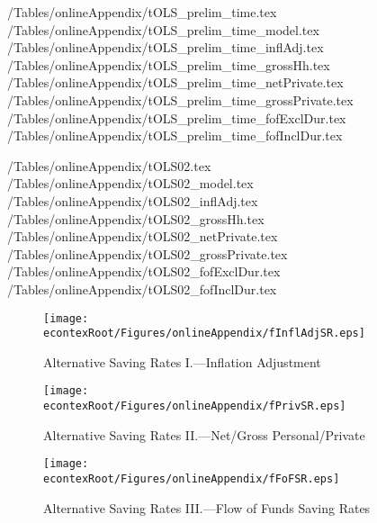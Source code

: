 
\econtexRoot/Tables/onlineAppendix/tOLS_prelim_time.tex
\econtexRoot/Tables/onlineAppendix/tOLS_prelim_time_model.tex
\econtexRoot/Tables/onlineAppendix/tOLS_prelim_time_inflAdj.tex
\econtexRoot/Tables/onlineAppendix/tOLS_prelim_time_grossHh.tex
\econtexRoot/Tables/onlineAppendix/tOLS_prelim_time_netPrivate.tex
\econtexRoot/Tables/onlineAppendix/tOLS_prelim_time_grossPrivate.tex
\econtexRoot/Tables/onlineAppendix/tOLS_prelim_time_fofExclDur.tex
\econtexRoot/Tables/onlineAppendix/tOLS_prelim_time_fofInclDur.tex

\clearpage
\econtexRoot/Tables/onlineAppendix/tOLS02.tex
\econtexRoot/Tables/onlineAppendix/tOLS02_model.tex
\econtexRoot/Tables/onlineAppendix/tOLS02_inflAdj.tex
\econtexRoot/Tables/onlineAppendix/tOLS02_grossHh.tex
\econtexRoot/Tables/onlineAppendix/tOLS02_netPrivate.tex
\econtexRoot/Tables/onlineAppendix/tOLS02_grossPrivate.tex
\econtexRoot/Tables/onlineAppendix/tOLS02_fofExclDur.tex
\econtexRoot/Tables/onlineAppendix/tOLS02_fofInclDur.tex
\clearpage


\begin{figure}
\caption{Alternative Saving Rates I.---Inflation Adjustment}
\begin{center} \label{fInflAdjSR}
\texttt{[image: \\econtexRoot/Figures/onlineAppendix/fInflAdjSR.eps]}
\end{center}
\end{figure}

\begin{figure}
\caption{Alternative Saving Rates II.---Net/Gross Personal/Private}
\begin{center} \label{fPrivSR}
\texttt{[image: \\econtexRoot/Figures/onlineAppendix/fPrivSR.eps]}
\end{center}
\end{figure}

\begin{figure}
\caption{Alternative Saving Rates III.---Flow of Funds Saving Rates}
\begin{center} \label{fFoFSR}
\texttt{[image: \\econtexRoot/Figures/onlineAppendix/fFoFSR.eps]}
\end{center}
\end{figure}
\clearpage

